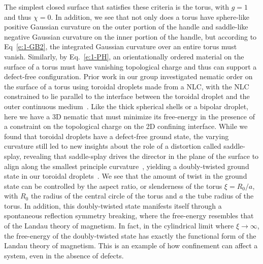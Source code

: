 The simplest closed surface that satisfies these criteria is the torus, with $g = 1$ and thus $\chi = 0$.
In addition, we see that not only does a torus have sphere-like positive Gaussian curvature on the outer portion of the handle and saddle-like negative Gaussian curvature on the inner portion of the handle, but according to Eq~\ref{e:1-GB2}, the integrated Gaussian curvature over an entire torus must vanish.
Similarly, by Eq.~\ref{e:1-PH}, an orientationally ordered material on the surface of a torus must have vanishing topological charge and thus can support a defect-free configuration.
Prior work in our group investigated nematic order on the surface of a torus using toroidal droplets made from a NLC, with the NLC constrained to lie parallel to the interface between the toroidal droplet and the outer continuous medium~\cite{RN46,RN47}.
Like the thick spherical shells or a bipolar droplet, here we have a 3D nematic that must minimize its free-energy in the presence of a constraint on the topological charge on the 2D confining interface.
While we found that toroidal droplets have a defect-free ground state, the varying curvature still led to new insights about the role of a distortion called saddle-splay, revealing that saddle-splay drives the director in the plane of the surface to align along the smallest principle curvature~\cite{RN59}, yielding a doubly-twisted ground state in our toroidal droplets~\cite{RN46}.
We see that the amount of twist in the ground state can be controlled by the aspect ratio, or slenderness of the torus $\xi = R_0/a$, with $R_0$ the radius of the central circle of the torus and $a$ the tube radius of the torus.
In addition, this doubly-twisted state manifests itself through a spontaneous reflection symmetry breaking, where the free-energy resembles that of the Landau theory of magnetism.
In fact, in the cylindrical limit where $\xi \rightarrow \infty$, the free-energy of the doubly-twisted state has exactly the functional form of the Landau theory of magnetism.
This is an example of how confinement can affect a system, even in the absence of defects.

